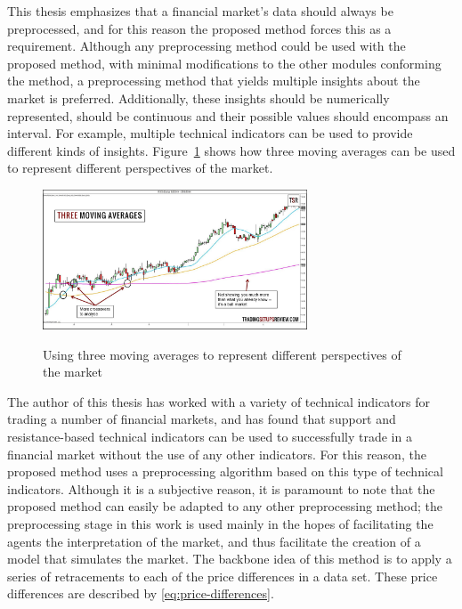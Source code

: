 This thesis emphasizes that a financial market's data should always be
preprocessed, and for this reason the proposed method forces this as a
requirement. Although any preprocessing method could be used with the proposed
method, with minimal modifications to the other modules conforming the method, a
preprocessing method that yields multiple insights about the market is
preferred. Additionally, these insights should be numerically represented,
should be continuous and their possible values should encompass an interval. For
example, multiple technical indicators can be used to provide different kinds of
insights. Figure~\ref{figure:multiple-technical-indicators} shows how three
moving averages can be used to represent different perspectives of the market.

\begin{figure}
\caption{Using three moving averages to represent different perspectives of the
  market} \centering
\includegraphics[width=0.7\textwidth]{img/multiple-technical-indicators.jpg}
\label{figure:multiple-technical-indicators}
\end{figure}

The author of this thesis has worked with a variety of technical indicators for
trading a number of financial markets, and has found that support and
resistance-based technical indicators can be used to successfully trade in a
financial market without the use of any other indicators. For this reason, the
proposed method uses a preprocessing algorithm based on this type of technical
indicators. Although it is a subjective reason, it is paramount to note that the
proposed method can easily be adapted to any other preprocessing method; the
preprocessing stage in this work is used mainly in the hopes of facilitating the
agents the interpretation of the market, and thus facilitate the creation of a
model that simulates the market. The backbone idea of this method is to apply a
series of retracements to each of the price differences in a data set. These
price differences are described by \ref{eq:price-differences}.

